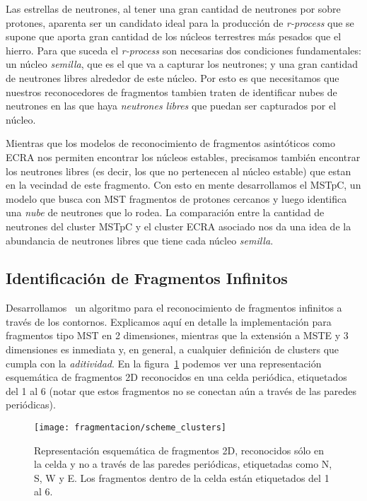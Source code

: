 Las estrellas de neutrones, al tener una gran cantidad de neutrones por sobre protones, aparenta ser un candidato ideal para la producción de \emph{r-process} que se supone que aporta gran cantidad de los núcleos terrestres más pesados que el hierro.
Para que suceda el \emph{r-process} son necesarias dos condiciones fundamentales: un núcleo \emph{semilla}, que es el que va a capturar los neutrones; y una gran cantidad de neutrones libres alrededor de este núcleo.
Por esto es que necesitamos que nuestros reconocedores de fragmentos tambien traten de identificar nubes de neutrones en las que haya \emph{neutrones libres} que puedan ser capturados por el núcleo.

Mientras que los modelos de reconocimiento de fragmentos asintóticos como ECRA nos permiten encontrar los núcleos estables, precisamos también encontrar los neutrones libres (es decir, los que no pertenecen al núcleo estable) que estan en la vecindad de este fragmento.
Con esto en mente desarrollamos el MSTpC, un modelo que busca con MST fragmentos de protones cercanos y luego identifica una \emph{nube} de neutrones que lo rodea.
La comparación entre la cantidad de neutrones del cluster MSTpC y el cluster ECRA asociado nos da una idea de la abundancia de neutrones libres que tiene cada núcleo \emph{semilla}.

\subsection{Identificación de Fragmentos Infinitos}
Desarrollamos~\cite{alcain_fragmentation_2017} un algoritmo para el reconocimiento de fragmentos infinitos a través de los contornos.
Explicamos aquí en detalle la implementación para fragmentos tipo MST en 2 dimensiones, mientras que la extensión a MSTE y 3 dimensiones es inmediata y, en general, a cualquier definición de clusters que cumpla con la \emph{aditividad}.
En la figura~\ref{fig:scheme_clusters} podemos ver una representación esquemática de fragmentos 2D reconocidos en una celda periódica, etiquetados del 1 al 6 (notar que estos fragmentos no se conectan aún a través de las paredes periódicas).

\begin{figure}  \centering
  \texttt{[image: fragmentacion/scheme\_clusters]}
  \caption{Representación esquemática de fragmentos 2D, reconocidos sólo en la celda y no a través de las paredes periódicas, etiquetadas como N, S, W y E.
  Los fragmentos dentro de la celda están etiquetados del 1 al 6.}
\label{fig:scheme_clusters}
\end{figure}

